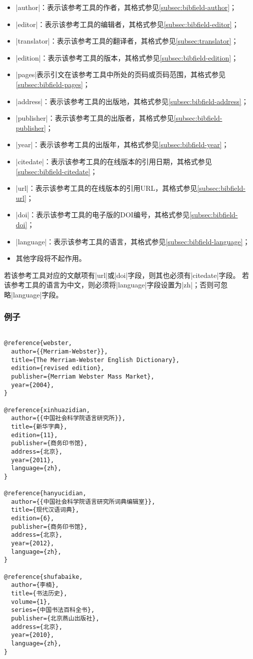 \begin{itemize}
\item |author|：表示该参考工具的作者，其格式参见\ref{subsec:bibfield-author}；
\item |editor|：表示该参考工具的编辑者，其格式参见\ref{subsec:bibfield-editor}；
\item |translator|：表示该参考工具的翻译者，其格式参见\ref{subsec:translator}；
\item |edition|：表示该参考工具的版本，其格式参见\ref{subsec:bibfield-edition}；
\item |pages|表示引文在该参考工具中所处的页码或页码范围，其格式参见\ref{subsec:bibfield-pages}；
\item |address|：表示该参考工具的出版地，其格式参见\ref{subsec:bibfield-address}；
\item |publisher|：表示该参考工具的出版者，其格式参见\ref{subsec:bibfield-publisher}；
\item |year|：表示该参考工具的出版年，其格式参见\ref{subsec:bibfield-year}；
\item |citedate|：表示该参考工具的在线版本的引用日期，其格式参见\ref{subsec:bibfield-citedate}；
\item |url|：表示该参考工具的在线版本的引用URL，其格式参见\ref{subsec:bibfield-url}；
\item |doi|：表示该参考工具的电子版的DOI编号，其格式参见\ref{subsec:bibfield-doi}；
\item |language|：表示该参考工具的语言，其格式参见\ref{subsec:bibfield-language}；
\item 其他字段将不起作用。
\end{itemize}

\begin{note}
若该参考工具对应的文献项有|url|或|doi|字段，则其也必须有|citedate|字段。
若该参考工具的语言为中文，则必须将|language|字段设置为|zh|；否则可忽略|language|字段。
\end{note}

\subsubsection{例子}

\begin{verbatim}

@reference{webster,
  author={{Merriam-Webster}},  
  title={The Merriam-Webster English Dictionary},
  edition={revised edition},
  publisher={Merriam Webster Mass Market},
  year={2004},
}

@reference{xinhuazidian,
  author={{中国社会科学院语言研究所}},
  title={新华字典},
  edition={11},
  publisher={商务印书馆},
  address={北京},
  year={2011},
  language={zh},
}

@reference{hanyucidian,
  author={{中国社会科学院语言研究所词典编辑室}},
  title={现代汉语词典},
  edition={6},
  publisher={商务印书馆},
  address={北京},
  year={2012},
  language={zh},
}

@reference{shufabaike,
  author={李楠},
  title={书法历史},
  volume={1},
  series={中国书法百科全书},
  publisher={北京燕山出版社},
  address={北京},
  year={2010},
  language={zh},
}
\end{verbatim}


